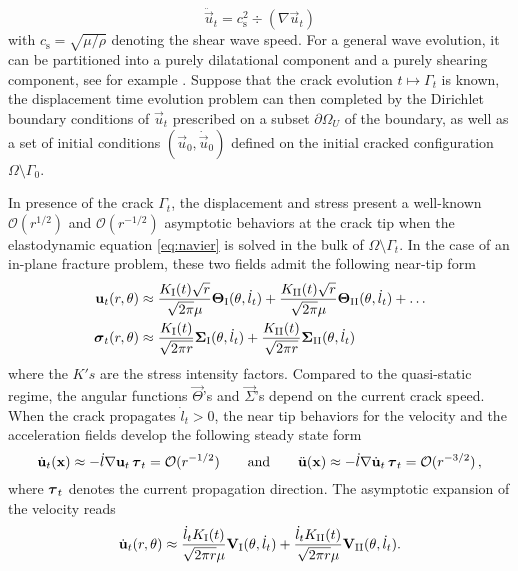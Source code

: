 \[
\ddot{\vec{u}}_t=c_\mathrm{s}^2\div(\nabla\vec{u}_t)
\]
with $c_\mathrm{s}=\sqrt{\mu/\rho}$ denoting the shear wave speed. For a general wave evolution, it can be partitioned into a purely dilatational component and a purely shearing component, see for example \cite{Sternberg:1960aa}. Suppose that the crack evolution $t\mapsto\Gamma_t$ is known, the displacement time evolution problem can then completed by the Dirichlet boundary conditions of $\vec{u}_t$ prescribed on a subset $\partial\Omega_U$ of the boundary, as well as a set of initial conditions $(\vec{u}_0,\dot{\vec{u}}_0)$ defined on the initial cracked configuration $\Omega\setminus\Gamma_0$.

In presence of the crack $\Gamma_t$, the displacement and stress present a well-known $\mathcal{O}(r^{1/2})$ and $\mathcal{O}(r^{-1/2})$ asymptotic behaviors at the crack tip when the elastodynamic equation \eqref{eq:navier} is solved in the bulk of $\Omega\setminus\Gamma_t$. In the case of an in-plane fracture problem, these two fields admit the following near-tip form
\begin{equation} \label{eq:singularform}
\begin{aligned}
\vec{u}_t(r,\theta) &\approx \frac{K_\RNN{1}(t)\sqrt{r}}{\sqrt{2\pi}\mu}\vec{\Theta}_\RNN{1}(\theta,\dot{l}_t)+\frac{K_\RNN{2}(t)\sqrt{r}}{\sqrt{2\pi}\mu}\vec{\Theta}_\RNN{2}(\theta,\dot{l}_t)+\ldots \\
\sig_t(r,\theta) &\approx \frac{K_\RNN{1}(t)}{\sqrt{2\pi r}}\vec{\Sigma}_\RNN{1}(\theta,\dot{l}_t)+\frac{K_\RNN{2}(t)}{\sqrt{2\pi r}}\vec{\Sigma}_\RNN{2}(\theta,\dot{l}_t)
\end{aligned}
\end{equation}
where the $K's$ are the stress intensity factors. Compared to the quasi-static regime, the angular functions $\vec{\Theta}$'s and $\vec{\Sigma}$'s depend on the current crack speed. When the crack propagates $\dot{l}_t>0$, the near tip behaviors for the velocity and the acceleration fields develop the following steady state form
\begin{equation} \label{eq:steadystatecondition}
\dot{\vec{u}}_t(\vec{x})\approx -\dot{l}\nabla\vec{u}_t\,\vtau_t=\mathcal{O}(r^{-1/2})\qquad\text{and}\qquad\ddot{\vec{u}}(\vec{x})\approx -\dot{l}\nabla\dot{\vec{u}}_t\,\vtau_t=\mathcal{O}(r^{-3/2})\,,
\end{equation}
where $\vtau_t$ denotes the current propagation direction. The asymptotic expansion of the velocity reads
\begin{equation} \label{eq:vasymp}
\dot{\vec{u}}_t(r,\theta)\approx\frac{\dot{l}_tK_\RNN{1}(t)}{\sqrt{2\pi r}\mu}\vec{V}_\RNN{1}(\theta,\dot{l}_t)+\frac{\dot{l}_tK_\RNN{2}(t)}{\sqrt{2\pi r}\mu}\vec{V}_\RNN{2}(\theta,\dot{l}_t).
\end{equation}

